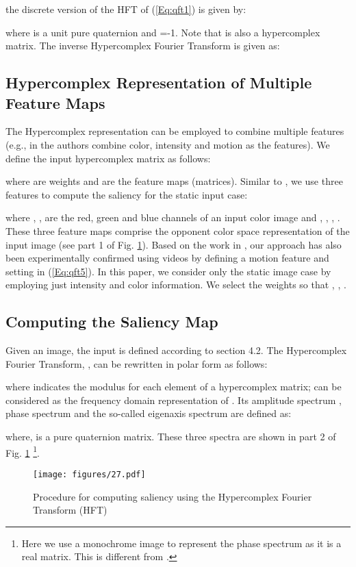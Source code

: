 \documentclass[10pt,journal,cspaper,compsoc]{IEEEtran}
\begin{document}
the discrete version of the HFT of (\ref{Eq:qft1}) is given by:

where   is a unit pure quaternion and  =-1. Note that  is also a hypercomplex matrix. The inverse Hypercomplex Fourier Transform is given as:


\subsection{Hypercomplex Representation of Multiple Feature Maps}
The Hypercomplex representation can be employed to combine multiple features (e.g., in \cite{guo2010multiresolution} the authors combine color, intensity and motion as the features). We define the input hypercomplex matrix as follows:

where   are weights and   are the feature maps (matrices). Similar to \cite{Itti_etal98pami}, we use three features to compute the saliency for the static input case:



where , ,  are the red, green and blue channels of an input color image and , , , .
These three feature maps comprise the opponent color space representation of the input image (see part 1 of Fig. \ref{fig:pHFT}). Based on the work in \cite{guo2010multiresolution}, our approach has also been experimentally confirmed using videos by defining a motion feature  and setting   in (\ref{Eq:qft5}). In this paper, we consider only the static image case by employing just intensity and color information. We select the weights so that ,  ,  .

\subsection{Computing the Saliency Map}

Given an image, the input is defined according to section 4.2. The Hypercomplex Fourier Transform, , can be rewritten in polar form as follows:

where  indicates the modulus for each element of a hypercomplex matrix;
 can be considered as the frequency domain representation of .  Its amplitude spectrum , phase spectrum  and the so-called eigenaxis spectrum  are defined as:



where,  is a pure quaternion matrix. These three spectra are shown in part 2 of Fig. \ref{fig:pHFT} \footnote{Here we use a monochrome image to represent the phase spectrum  as it is a real matrix. This is different from  \cite{ell2006hypercomplex}.}.
\begin{figure}
\begin{center}
\texttt{[image: figures/27.pdf]}
\end{center}
   \caption{Procedure for computing  saliency  using the Hypercomplex Fourier Transform (HFT)}
\label{fig:pHFT}
\end{figure}
\end{document}
